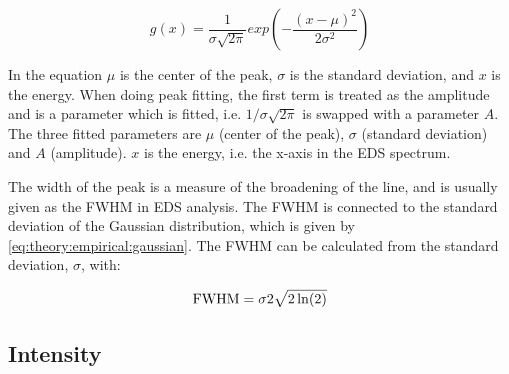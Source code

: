 \begin{equation}
    \label{eq:theory:empirical:gaussian}
    g(x) = \frac{1}{\sigma \sqrt{2\pi}} exp({-\frac{(x-\mu)^2}{2\sigma^2}})
\end{equation}

In the equation $\mu$ is the center of the peak, $\sigma$ is the standard deviation, and $x$ is the energy.
When doing peak fitting, the first term is treated as the amplitude and is a parameter which is fitted, i.e. $1/\sigma\sqrt{2\pi}$ is swapped with a parameter $A$.
The three fitted parameters are $\mu$ (center of the peak), $\sigma$ (standard deviation) and $A$ (amplitude).
$x$ is the energy, i.e. the x-axis in the EDS spectrum.

The width of the peak is a measure of the broadening of the line, and is usually given as the FWHM in EDS analysis. The FWHM is connected to the standard deviation of the Gaussian distribution, which is given by \cref{eq:theory:empirical:gaussian}.
The FWHM can be calculated from the standard deviation, $\sigma$, with:

\begin{equation}
    \label{eq:theory:empirical:peaks:FWHM}
    \textnormal{FWHM} = {\sigma}{2\sqrt{2\ln(2)}}
\end{equation}


%
% 
\subsection{Intensity}
\label{sec:theory:empirical:intensity}



